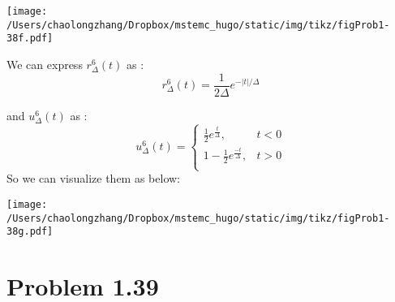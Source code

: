 \documentclass[koma,a4paper,utopia,12pt,listings-color,microtype,paralist,colorlinks,urlcolor=red]{org-article}
\begin{document}
\begin{center}
\texttt{[image: /Users/chaolongzhang/Dropbox/mstemc\_hugo/static/img/tikz/figProb1-38f.pdf]}
\end{center}

We can express \(r_{\Delta}^{6}(t)\) as :
\begin{equation*}
r_{\Delta}^{6}(t) = \frac{1}{2\Delta} e^{-|t|/\Delta}
\end{equation*}

and \(u_{\Delta}^{6}(t)\) as :
\begin{equation*}
u_{\Delta}^{6}(t) =
\begin{cases}
\frac{1}{2} e^{\frac{t}{\Delta}} , & t< 0 \\
1 - \frac{1}{2}e^{ \frac{-t}{\Delta}} , & t> 0 \\
\end{cases}
\end{equation*}
So we can visualize them as below:
\begin{center}
\texttt{[image: /Users/chaolongzhang/Dropbox/mstemc\_hugo/static/img/tikz/figProb1-38g.pdf]}
\end{center}
\section{Problem 1.39}
\label{sec:org95fdb02}
\end{document}
